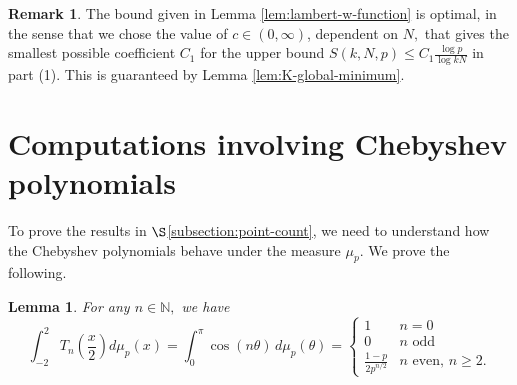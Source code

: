 \documentclass[11pt,letterpaper,reqno]{amsart}
\newtheorem{lemma}[theorem]{Lemma}
\theoremstyle{definition}
\newtheorem{remark}[theorem]{Remark}
\numberwithin{equation}{section}
\numberwithin{figure}{section}
\numberwithin{table}{section}
\begin{document}
\begin{remark}
    The bound given in Lemma \ref{lem:lambert-w-function} is optimal, in the sense that we chose the value of $c \in (0, \infty)$, dependent on $N,$ that gives the smallest possible coefficient $C_1$ for the upper bound $S(k,N,p) \le C_1 \frac{\log p}{\log kN}$ in part (1). This is guaranteed by Lemma \ref{lem:K-global-minimum}.
\end{remark}



\section{Computations involving Chebyshev polynomials}\label{section:chebyshev}


To prove the results in $\S$\ref{subsection:point-count}, we need to understand how the Chebyshev polynomials behave under the measure $\mu_p$. We prove the following.

\begin{lemma}\label{lemma:Chebyshev-integral}
    For any $n \in \mathbb{N},$ we have
    $$\int_{-2}^2 T_n \left(\frac{x}{2}\right) d\mu_p(x) = \int_{0}^\pi \cos(n \theta) \, d \mu_p(\theta) = \begin{cases}
        1 & n = 0\\
        0 & \text{$n$ odd}\\
        \frac{1-p}{2 p^{n/2}} & \text{$n$ even, $n \geq 2$.}
    \end{cases}$$
\end{lemma}
\end{document}
